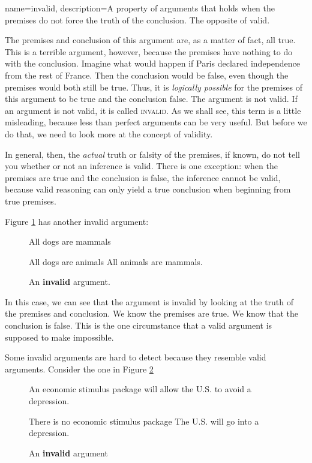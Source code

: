 {
name=invalid,
description={A property of arguments that holds when the premises do not force the truth of the conclusion. The opposite of valid.}
}


The premises and conclusion of this argument are, as a matter of fact, all true. This is a terrible argument, however, because the premises have nothing to do with the conclusion. Imagine what would happen if Paris declared independence from the rest of France. Then the conclusion would be false, even though the premises would both still be true. Thus, it is \emph{logically possible} for the premises of this argument to be true and the conclusion false. The argument is not valid.  If an argument is not valid, it is called \textsc{\gls{invalid}}. \label{def:invalid} As we shall see, this term is a little misleading, because less than perfect arguments can be very useful. But before we do that, we need to look more at the concept of validity.

In general, then, the \textit{actual }truth or falsity of the premises, if known, do not tell you whether or not an inference is valid. There is one exception: when the premises are true and the conclusion is false, the inference cannot be valid, because valid reasoning can only yield a true conclusion when beginning from true premises.

Figure \ref{fig:invalid_animals} has another invalid argument:

\begin{figure}
\begin{mdframed}[style=mytablehalfbox]
\begin{earg*}
\item All dogs are mammals
\item All dogs are animals
\itemc All animals are mammals.
\end{earg*}
\end{mdframed}
\caption{An \textbf{invalid} argument.} \label{fig:invalid_animals}
\end{figure}

In this case, we can see that the argument is invalid by looking at the truth of the premises and conclusion. We know the premises are true. We know that the conclusion is false. This is the one circumstance that a valid argument is supposed to make impossible.

Some invalid arguments are hard to detect because they resemble valid arguments. Consider the one in Figure \ref{fig:invalid_stimulus}

\begin{figure}[b]
\begin{mdframed}[style=mytablebox]
\begin{earg*}
\item An economic stimulus package will allow the U.S. to avoid a depression.
\item There is no economic stimulus package
\itemc[.3] The U.S. will go into a depression.
\end{earg*}
\end{mdframed}
\caption{An \textbf{invalid} argument} \label{fig:invalid_stimulus}
\end{figure}


